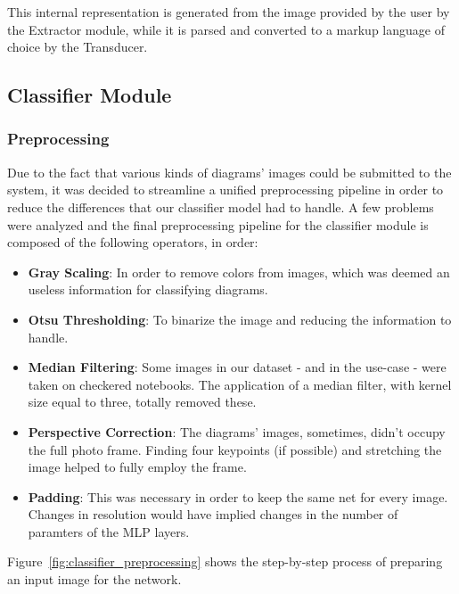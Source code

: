 \documentclass[conference]{IEEEtran}
\begin{document}
This internal representation is generated from the image provided by the user by the Extractor module, while it is parsed and converted to a markup language of choice by the Transducer. 

\subsection{Classifier Module}
\subsubsection{Preprocessing}
Due to the fact that various kinds of diagrams' images could be submitted to the system, it was decided to streamline a unified preprocessing pipeline in order to reduce the differences that our classifier model had to handle. A few problems were analyzed and the final preprocessing pipeline for the classifier module is composed of the following operators, in order:
\begin{itemize}
	\item \textbf{Gray Scaling}: In order to remove colors from images, which was deemed an useless information for classifying diagrams.
	\item \textbf{Otsu Thresholding}: To binarize the image and reducing the information to handle.
	\item \textbf{Median Filtering}: Some images in our dataset - and in the use-case - were taken on checkered notebooks. The application of a median filter, with kernel size equal to three, totally removed these.
	\item \textbf{Perspective Correction}: The diagrams' images, sometimes, didn't occupy the full photo frame. Finding four keypoints (if possible) and stretching the image helped to fully employ the frame.
	\item \textbf{Padding}: This was necessary in order to keep the same net for every image. Changes in resolution would have implied changes in the number of paramters of the MLP layers.
\end{itemize}

Figure~\ref{fig:classifier_preprocessing} shows the step-by-step process of preparing an input image for the network.
\end{document}

